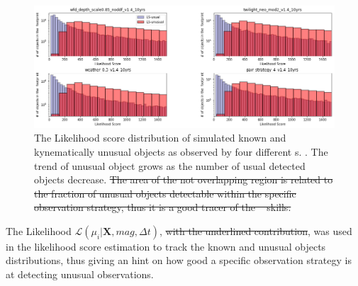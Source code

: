 \begin{figure}
\centering
\includegraphics[scale=0.55]{figures/LS_distribution.png}
\caption{The Likelihood score distribution of simulated known and kynematically unusual objects as observed by four different \opsim s.  . The trend of unusual object grows as the number of usual detected objects decrease. \sout{The area of the not overlapping region is related to the fraction of unusual objects detectable within the specific observation strategy, thus it is a good tracer of the \opsim~ skills.} }
\label{fig:PM_distribution}
\end{figure}
The Likelihood $\mathcal{L}\left(\mu_i|\mathbf{X}, mag, \Delta t\right)$, \sout{with the underlined contribution},  was used in the likelihood score estimation to track the known and unusual objects distributions, thus giving an hint on how good  a specific observation strategy is at detecting unusual observations.

